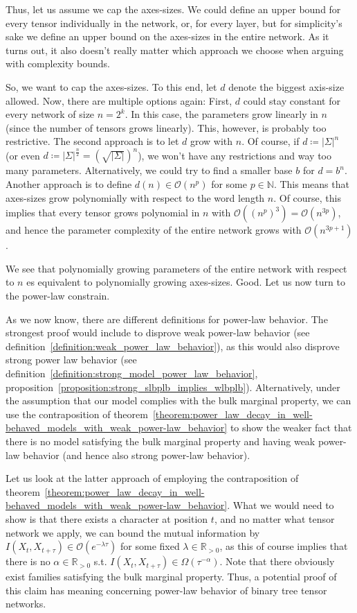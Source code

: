 \documentclass[../../main.tex]{subfiles}
\begin{document}
    Thus, let us assume we cap the axes-sizes. We could define an upper bound for every tensor individually in the network, or, for every layer, but for simplicity's sake we define an upper bound on the axes-sizes in the entire network. As it turns out, it also doesn't really matter which approach we choose when arguing with complexity bounds.

    So, we want to cap the axes-sizes. To this end, let $d$ denote the biggest axis-size allowed. Now, there are multiple options again: First, $d$ could stay constant for every network of size $n = 2^k$. In this case, the parameters grow linearly in $n$ (since the number of tensors grows linearly). This, however, is probably too restrictive. The second approach is to let $d$ grow with $n$. Of course, if $d \coloneqq |\Sigma|^n$ (or even $d \coloneqq |\Sigma|^{\frac{n}{2}} = \left(\sqrt{|\Sigma|}\right)^n$), we won't have any restrictions and way too many parameters. Alternatively, we could try to find a smaller base $b$ for $d = b^n$. Another approach is to define $d(n) \in \mathcal{O}(n^p)$ for some $p \in \mathbb{N}$. This means that axes-sizes grow polynomially with respect to the word length $n$. Of course, this implies that every tensor grows polynomial in $n$ with $\mathcal{O}((n^p)^3) = \mathcal{O}(n^{3p})$, and hence the parameter complexity of the entire network grows with $\mathcal{O}(n^{3p+1})$.

    \bigskip
    We see that polynomially growing parameters of the entire network with respect to $n$ es equivalent to polynomially growing axes-sizes. Good. Let us now turn to the power-law constrain.

    \bigskip
    As we now know, there are different definitions for power-law behavior. The strongest proof would include to disprove weak power-law behavior (see definition~\ref{definition:weak_power_law_behavior}), as this would also disprove strong power law behavior (see definition~\ref{definition:strong_model_power_law_behavior}, proposition~\ref{proposition:strong_slbplb_implies_wlbplb}). Alternatively, under the assumption that our model complies with the bulk marginal property, we can use the contraposition of theorem~\ref{theorem:power_law_decay_in_well-behaved_models_with_weak_power-law_behavior} to show the weaker fact that there is no model satisfying the bulk marginal property and having weak power-law behavior (and hence also strong power-law behavior).

    Let us look at the latter approach of employing the contraposition of theorem~\ref{theorem:power_law_decay_in_well-behaved_models_with_weak_power-law_behavior}. What we would need to show is that there exists a character at position $t$, and no matter what tensor network we apply, we can bound the mutual information by $I(X_t, X_{t + \tau}) \in \mathcal{O}(e^{-\lambda \tau})$ for some fixed $\lambda \in \mathbb{R}_{>0}$, as this of course implies that there is no $\alpha \in \mathbb{R}_{>0}$ s.t. $I(X_t, X_{t + \tau}) \in \Omega(\tau^{-\alpha})$. Note that there obviously exist families satisfying the bulk marginal property. Thus, a potential proof of this claim has meaning concerning power-law behavior of binary tree tensor networks.
\end{document}
